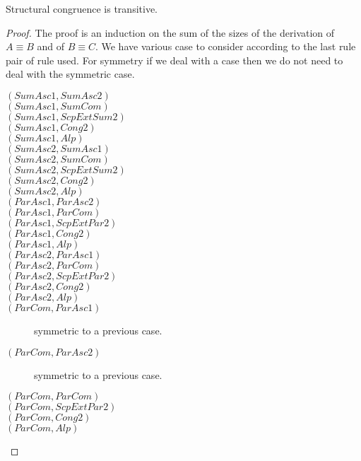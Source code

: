 \begin{lemma}
  Structural congruence is transitive.
  \begin{proof}
    The proof is an induction on the sum of the sizes of the derivation of $A\equiv B$ and of $B\equiv C$. We have various case to consider according to the last rule pair of rule used. For symmetry if we deal with a case then we do not need to deal with the symmetric case.
    \begin{description}
      \item[$(SumAsc1, SumAsc2)$]
      \item[$(SumAsc1, SumCom)$]
      \item[$(SumAsc1, ScpExtSum2)$]
      \item[$(SumAsc1, Cong2)$]
      \item[$(SumAsc1, Alp)$]

      \item[$(SumAsc2, SumAsc1)$]
      \item[$(SumAsc2, SumCom)$]
      \item[$(SumAsc2, ScpExtSum2)$]
      \item[$(SumAsc2, Cong2)$]
      \item[$(SumAsc2, Alp)$]

      \item[$(ParAsc1, ParAsc2)$]
      \item[$(ParAsc1, ParCom)$]
      \item[$(ParAsc1, ScpExtPar2)$]
      \item[$(ParAsc1, Cong2)$]
      \item[$(ParAsc1, Alp)$]

      \item[$(ParAsc2, ParAsc1)$]
      \item[$(ParAsc2, ParCom)$]
      \item[$(ParAsc2, ScpExtPar2)$]
      \item[$(ParAsc2, Cong2)$]
      \item[$(ParAsc2, Alp)$]

      \item[$(ParCom, ParAsc1)$] symmetric to a previous case.
      \item[$(ParCom, ParAsc2)$] symmetric to a previous case.
      \item[$(ParCom, ParCom)$]
      \item[$(ParCom, ScpExtPar2)$]
      \item[$(ParCom, Cong2)$]
      \item[$(ParCom, Alp)$]
      

\end{description}
\end{proof}
\end{lemma}
